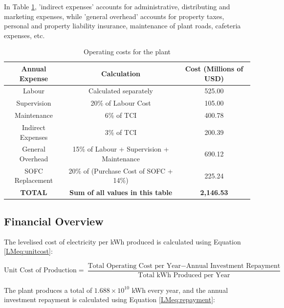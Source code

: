 \documentclass{article}
\begin{document}
In Table \ref{LMtable:opcosts}, 'indirect expenses' accounts for administrative, distributing and marketing expenses, while 'general overhead' accounts for property taxes, personal and property liability insurance, maintenance of plant roads, cafeteria expenses, etc.


\begin{table}[h]
\centering
\caption{Operating costs for the plant}
\label{LMtable:opcosts}
\begin{tabular}{|c|c|c|}
\hline
\textbf{Annual Expense} & \textbf{Calculation}                       & \textbf{Cost (Millions of USD)} \\ \hline
Labour                  & Calculated separately                      & 525.00           \\ \hline
Supervision             & 20\% of Labour Cost                        & 105.00           \\ \hline
Maintenance             & 6\% of TCI                                 & 400.78           \\ \hline
Indirect Expenses       & 3\% of TCI                                 & 200.39           \\ \hline
General Overhead        & 15\% of Labour + Supervision + Maintenance & 690.12           \\ \hline
SOFC Replacement        & 20\% of (Purchase Cost of SOFC + 14\%)     & 225.24           \\ \hline
\textbf{TOTAL}          & \textbf{Sum of all values in this table}   & \textbf{2,146.53} \\ \hline
\end{tabular}
\end{table}



\subsection{Financial Overview}

The levelised cost of electricity per kWh produced is calculated using Equation \ref{LMeq:unitcost}:

\begin{equation}
    \text{Unit Cost of Production} = \frac{\text{Total Operating Cost per Year} - \text{Annual Investment Repayment}}{\text{Total kWh Produced per Year}}
    \label{LMeq:unitcost}
\end{equation}


The plant produces a total of $\text{1.688} \times \text{10}^{\text{10}}$ kWh every year, and the annual investment repayment is calculated using Equation \ref{LMeq:repayment}:
\end{document}
